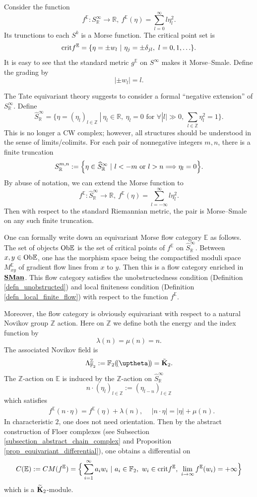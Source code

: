 \documentclass[reqno, 10pt]{amsart}
\numberwithin{equation}{section}
\numberwithin{equation}{section}
\theoremstyle{definition}
\theoremstyle{remark}
\newcommand{\beqn}{\begin{equation*}}
\newcommand{\eeqn}{\end{equation*}}
\newcommand{\mb}{\mathbb}
\newcommand{\ep}{{{\mathbb E}}}
\newcommand{\lst}{{(\!(\uptheta)\!)}}
\newcommand{\wt}{\widetilde}
\newcommand{\wh}{\widehat}
\newcommand{\uds}[1]{\underline{\smash{#1}}}
\begin{document}
Consider the function 
\beqn
f^{\mb E}: S_{\mb R}^\infty \to {\mb R},\ f^{\mb E}(\eta) = \sum_{l=0}^\infty l \eta_l^2.
\eeqn
Its trunctions to each $S^k$ is a Morse function. The critical point set is 
\beqn
{\rm crit} f^{\mb E} = \{ \eta = \pm w_l \ |\ \eta_j = \pm \delta_{jl},\ l = 0, 1, \ldots \}.
\eeqn
It is easy to see that the standard metric $g^{\mb E}$ on $S^\infty$ makes it Morse--Smale. Define the grading by 
\beqn
|\pm w_l| = l.
\eeqn

The Tate equivariant theory suggests to consider a formal ``negative extension'' of $S_{\mb R}^\infty$. Define
\beqn
\wh S_{\mb R}^\infty = \Big\{  \eta = (\eta_l)_{l \in {\mb Z}}\ |\ \eta_l \in {\mb R},\ \eta_l = 0 \text{ for }\forall |l| \gg 0,\ \sum_{l\in {\mb Z}} \eta_l^2 = 1 \Big\}.
\eeqn
This is no longer a CW complex; however, all structures should be understood in the sense of limits/colimits. For each pair of nonnegative integers $m, n$, there is a finite truncation
\beqn
S^{m,n}_{\mb R}:= \Big\{ \eta \in \wh S_{\mb R}^\infty\ |\ l < -m\ {\rm or}\ l > n \Longrightarrow \eta_l = 0\Big\}.
\eeqn
By abuse of notation, we can extend the Morse function to
\beqn
f^{\mb E}: \wh S_{\mb R}^\infty \to {\mb R},\ f^{\mb E}(\eta) = \sum_{l=-\infty}^\infty l \eta_l^2.
\eeqn
Then with respect to the standard Riemannian metric, the pair is Morse--Smale on any such finite truncation. 

One can formally write down an equivariant Morse flow category ${\mb E}$ as follows. The set of objects ${\rm Ob} {\mb E}$ is the set of critical points of $f^{\mb E}$ on $\wh S^\infty_{\mb R}$. Between $x, y \in {\rm Ob}{\mb E}$, one has the morphism space being the compactified moduli space $M_{xy}^{\mb E}$ of gradient flow lines from $x$ to $y$. Then this is a flow category enriched in $\uds{\bf SMan}$. This flow category satisfies the unobstructedness condition (Definition \ref{defn_unobstructed}) and local finiteness condition (Definition \ref{defn_local_finite_flow}) with respect to the function $f^{\mb E}$. 

Moreover, the flow category is obviously equivariant with respect to a natural Novikov group ${\mb Z}$ action. Here on ${\mb Z}$ we define both the energy and the index function by 
\beqn
\lambda(n) = \mu(n) = n.
\eeqn
The associated Novikov field is
\beqn
\Lambda_{{\mb F}_2}^{\mb Z}:= {\mb F}_2 \lst = \tilde {\bf K}_2.
\eeqn
The ${\mb Z}$-action on ${\mb E}$ is induced by the ${\mb Z}$-action on $\wh S^\infty_{\mb R}$ 
\beqn
n \cdot (\eta_l)_{l\in {\mb Z}}:= (\eta_{l-n})_{l\in {\mb Z}}
\eeqn
which satisfies
\begin{align*}
& f^{\mb E}(n \cdot \eta) = f^{\mb E}(\eta) + \lambda(n),\ &\ |n \cdot \eta| = |\eta| +  \mu(n).
\end{align*}
In characteristic $2$, one does not need orientation. Then by the abstract construction of Floer complexes (see Subsection \ref{subsection_abstract_chain_complex} and Proposition \ref{prop_equivariant_differential}), one obtains a differential on
\beqn
C({\mb E}):= CM(f^\ep) =  \Big\{ \sum_{i=1}^\infty a_i w_i \ |\ a_i \in {\mb F}_2,\ w_i \in {\rm crit} f^{\mb E},\ \lim_{i \to \infty} f^{\ep}(w_i) = +\infty \Big\}
\eeqn
which is a $ \wt{\bf K}_2$-module.
\end{document}
